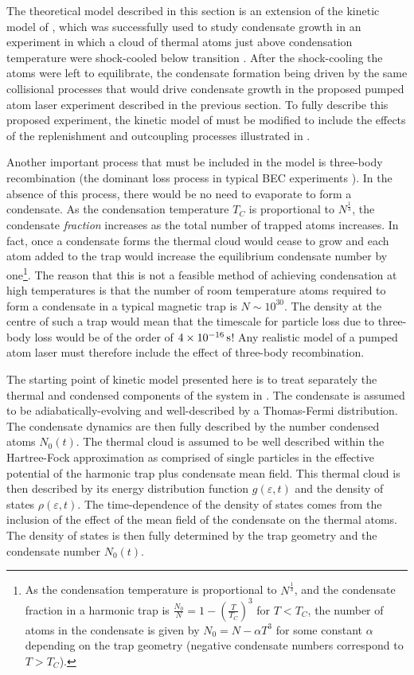 The theoretical model described in this section is an extension of the kinetic model of \citet{Bijlsma:2000}, which was successfully used to study condensate growth in an experiment in which a cloud of thermal atoms just above condensation temperature were shock-cooled below transition \citep{Miesner:1998}.  After the shock-cooling the atoms were left to equilibrate, the condensate formation being driven by the same collisional processes that would drive condensate growth in the proposed pumped atom laser experiment described in the previous section.  To fully describe this proposed experiment, the kinetic model of \citeauthor{Bijlsma:2000} must be modified to include the effects of the replenishment and outcoupling processes illustrated in . 

Another important process that must be included in the model is three-body recombination (the dominant loss process in typical BEC experiments \citep{Burt:1997fk,Soding:1999}). In the absence of this process, there would be no need to evaporate to form a condensate. As the condensation temperature $T_C$ is proportional to $N^{\frac{1}{3}}$, the condensate \emph{fraction} increases as the total number of trapped atoms increases. In fact, once a condensate forms the thermal cloud would cease to grow and each atom added to the trap would increase the equilibrium condensate number by one\footnote{As the condensation temperature is proportional to $N^{\frac{1}{3}}$, and the condensate fraction in a harmonic trap is $\displaystyle \frac{N_0}{N} = 1 - \left(\frac{T}{T_C}\right)^3$ for $T < T_C$, the number of atoms in the condensate is given by $N_0 = N - \alpha T^3$ for some constant $\alpha$ depending on the trap geometry (negative condensate numbers correspond to $T > T_C$).}. The reason that this is not a feasible method of achieving condensation at high temperatures is that the number of room temperature atoms required to form a condensate in a typical magnetic trap is $N \sim 10^{30}$. The density at the centre of such a trap would mean that the timescale for particle loss due to three-body loss would be of the order of $\unit[4\times10^{-16}]{s}$! Any realistic model of a pumped atom laser must therefore include the effect of three-body recombination.

\parasep

The starting point of kinetic model presented here is to treat separately the thermal and condensed components of the system in . The condensate is assumed to be adiabatically-evolving and well-described by a Thomas-Fermi distribution. The condensate dynamics are then fully described by the number condensed atoms $N_0(t)$. The thermal cloud is assumed to be well described within the Hartree-Fock approximation as comprised of single particles in the effective potential of the harmonic trap plus condensate mean field. This thermal cloud is then described by its energy distribution function $g(\varepsilon, t)$ and the density of states $\rho(\varepsilon, t)$. The time-dependence of the density of states comes from the inclusion of the effect of the mean field of the condensate on the thermal atoms. The density of states is then fully determined by the trap geometry and the condensate number $N_0(t)$.

